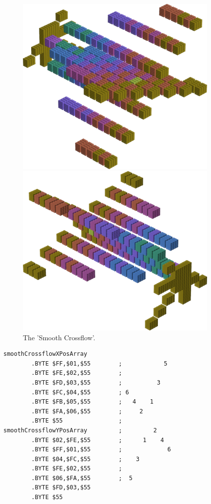 \begin{figure}[H]
    \centering
    \begin{adjustbox}{width=10cm,center}
      \includegraphics[width=10cm]{src/colorspace_patterns/pattern1-45.png}%
    \end{adjustbox}
    \begin{adjustbox}{width=10cm}
      \includegraphics[width=10cm]{src/colorspace_patterns/pattern1-225.png}%
    \end{adjustbox}
\caption{The 'Smooth Crossflow'.}
\end{figure}
\clearpage

\begin{lstlisting}
smoothCrossflowXPosArray
        .BYTE $FF,$01,$55        ;            5
        .BYTE $FE,$02,$55        ;              
        .BYTE $FD,$03,$55        ;          3   
        .BYTE $FC,$04,$55        ; 6            
        .BYTE $FB,$05,$55        ;   4    1     
        .BYTE $FA,$06,$55        ;     2        
        .BYTE $55                ;              
smoothCrossflowYPosArray         ;         2    
        .BYTE $02,$FE,$55        ;      1    4  
        .BYTE $FF,$01,$55        ;             6
        .BYTE $04,$FC,$55        ;    3         
        .BYTE $FE,$02,$55        ;              
        .BYTE $06,$FA,$55        ;  5           
        .BYTE $FD,$03,$55
        .BYTE $55
\end{lstlisting}


